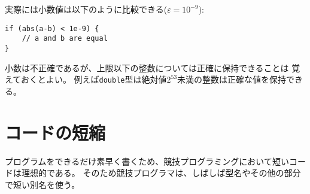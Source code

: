 実際には小数値は以下のように比較できる($\varepsilon=10^{-9}$):

\begin{lstlisting}
if (abs(a-b) < 1e-9) {
    // a and b are equal
}
\end{lstlisting}

\begin{comment}
Note that while floating point numbers are inaccurate,
integers up to a certain limit can still be
represented accurately.
For example, using \texttt{double},
it is possible to accurately represent all
integers whose absolute value is at most $2^{53}$.
\end{comment}

小数は不正確であるが、上限以下の整数については正確に保持できることは
覚えておくとよい。
例えば\texttt{double}型は絶対値$2^{53}$未満の整数は正確な値を保持できる。

\begin{comment}
\section{Shortening code}

Short code is ideal in competitive programming,
because programs should be written
as fast as possible.
Because of this, competitive programmers often define
shorter names for datatypes and other parts of code.
\end{comment}

\section{コードの短縮}

プログラムをできるだけ素早く書くため、競技プログラミングにおいて短いコードは理想的である。
そのため競技プログラマは、しばしば型名やその他の部分で短い別名を使う。

\begin{comment}
\subsubsection{Type names}
\index{tuppdef@\texttt{typedef}}
Using the command \texttt{typedef}
it is possible to give a shorter name
to a datatype.
For example, the name \texttt{long long} is long,
so we can define a shorter name \texttt{ll}:
\begin{lstlisting}
typedef long long ll;
\end{lstlisting}
After this, the code
\begin{lstlisting}
long long a = 123456789;
long long b = 987654321;
cout << a*b << "\n";
\end{lstlisting}
can be shortened as follows:
\begin{lstlisting}
ll a = 123456789;
ll b = 987654321;
cout << a*b << "\n";
\end{lstlisting}
\end{comment}

